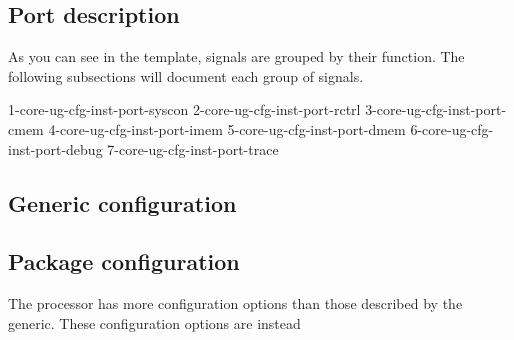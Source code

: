 \subsection{Port description}
\label{sec:core-ug-cfg-inst-port}

As you can see in the template, signals are grouped by their function. The
following subsections will document each group of signals.

{1-core-ug-cfg-inst-port-syscon}
{2-core-ug-cfg-inst-port-rctrl}
{3-core-ug-cfg-inst-port-cmem}
{4-core-ug-cfg-inst-port-imem}
{5-core-ug-cfg-inst-port-dmem}
{6-core-ug-cfg-inst-port-debug}
{7-core-ug-cfg-inst-port-trace}

\subsection{Generic configuration}
\label{sec:core-ug-cfg-inst-generic}


\subsection{Package configuration}
\label{sec:core-ug-cfg-inst-package}

The \rvex{} processor has more configuration options than those described by the
 generic. These configuration options are instead 